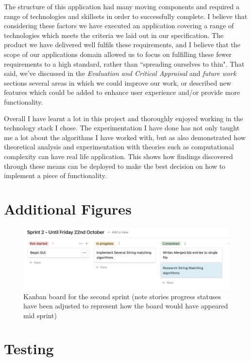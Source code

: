 \documentclass[a4paper,11pt]{article}
\begin{document}
The structure of this application had many moving components and required a range of technologies and skillsets in order to successfully complete. I believe that considering these factors we have executed an application covering a range of technologies which meets the criteria we laid out in our specification. The product we have delivered well fulfils these requirements, and I believe that the scope of our applications domain allowed us to focus on fulfilling these fewer requirements to a high standard, rather than ``spreading ourselves to thin". That said, we've discussed in the \textit{Evaluation and Critical Appraisal} and \textit{future work} sections several areas in which we could improve our work, or described new features which could be added to enhance user experience and/or provide more functionality.

Overall I have learnt a lot in this project and thoroughly enjoyed working in the technology stack I chose. The experimentation I have done has not only taught me a lot about the algorithms I have worked with, but as also demonstrated how theoretical analysis and experimentation with theories such as computational complexity can have real life application. This shows how findings discovered through these means can be deployed to make the best decision on how to implement a piece of functionality.
\newpage


\appendix

\section{Additional Figures}
\begin{figure}[H]
    \centering
    \includegraphics[width=\linewidth]{images/kanbanBoard.png}
    \caption{Kanban board for the second sprint (note stories progress statuses have been adjusted to represent how the board would have appeared mid sprint)}
    \label{fig:kanbanBoard}
\end{figure}

\section{Testing}
\end{document}
